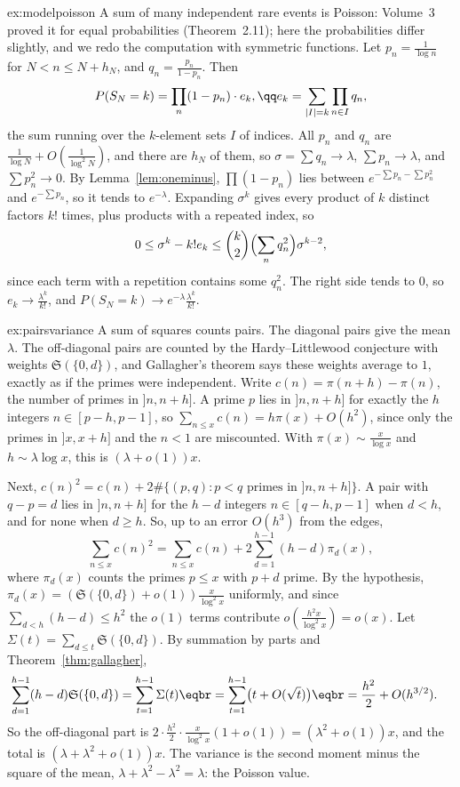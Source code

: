 \begin{solution}{ex:modelpoisson}
\idea A sum of many independent rare events is Poisson: Volume~3 proved it for equal probabilities (Theorem~2.11); here the probabilities differ slightly, and we redo the computation with symmetric functions.
\writeup Let $p_n=\frac1{\log n}$ for $N<n\le N+h_N$, and $q_n=\frac{p_n}{1-p_n}$. Then
\[
P(S_N=k)=\prod_n(1-p_n)\cdot e_k,\qq e_k=\sum_{|I|=k}\prod_{n\in I}q_n,
\]
the sum running over the $k$-element sets $I$ of indices. All $p_n$ and $q_n$ are $\frac1{\log N}+O(\frac1{\log^2N})$, and there are $h_N$ of them, so $\sigma=\sum q_n\to\lambda$, $\sum p_n\to\lambda$, and $\sum p_n^2\to0$. By
Lemma~\ref{lem:oneminus}, $\prod(1-p_n)$ lies between $e^{-\sum p_n-\sum p_n^2}$ and $e^{-\sum p_n}$, so it tends to $e^{-\lambda}$. Expanding $\sigma^k$ gives every product of $k$ distinct factors $k!$ times, plus products
with a repeated index, so
\[
0\le\sigma^k-k!e_k\le\binom k2\Bigl(\sum_nq_n^2\Bigr)\sigma^{k-2},
\]
since each term with a repetition contains some $q_n^2$. The right side tends to $0$, so $e_k\to\frac{\lambda^k}{k!}$, and $P(S_N=k)\to e^{-\lambda}\frac{\lambda^k}{k!}$.
\end{solution}

\begin{solution}{ex:pairsvariance}
\idea A sum of squares counts pairs. The diagonal pairs give the mean $\lambda$. The off-diagonal pairs are counted by the Hardy--Littlewood conjecture with weights $\mathfrak S(\{0,d\})$, and Gallagher's theorem
says these weights average to $1$, exactly as if the primes were independent.
\writeup Write $c(n)=\pi(n+h)-\pi(n)$, the number of primes in $]n,n+h]$. A prime $p$ lies in $]n,n+h]$ for exactly the $h$ integers $n\in[p-h,p-1]$, so
$\sum_{n\le x}c(n)=h\pi(x)+O(h^2)$, since only the primes in $]x,x+h]$ and the $n<1$ are miscounted. With $\pi(x)\sim\frac x{\log x}$ and $h\sim\lambda\log x$, this is $(\lambda+o(1))x$.

Next, $c(n)^2=c(n)+2\#\{(p,q):p<q\text{ primes in }]n,n+h]\}$. A pair with $q-p=d$ lies in $]n,n+h]$ for the $h-d$ integers $n\in[q-h,p-1]$ when $d<h$, and for none when $d\ge h$. So, up to an error $O(h^3)$ from the edges,
\[
\sum_{n\le x}c(n)^2=\sum_{n\le x}c(n)+2\sum_{d=1}^{h-1}(h-d)\pi_d(x),
\]
where $\pi_d(x)$ counts the primes $p\le x$ with $p+d$ prime. By the hypothesis, $\pi_d(x)=(\mathfrak S(\{0,d\})+o(1))\frac x{\log^2x}$ uniformly, and since $\sum_{d<h}(h-d)\le h^2$ the $o(1)$ terms contribute
$o(\frac{h^2x}{\log^2x})=o(x)$. Let $\Sigma(t)=\sum_{d\le t}\mathfrak S(\{0,d\})$. By summation by parts and Theorem~\ref{thm:gallagher},
\[
\begin{aligned}\sum_{d=1}^{h-1}(h-d)\mathfrak S(\{0,d\})&=\sum_{t=1}^{h-1}\Sigma(t)\eqbr=\sum_{t=1}^{h-1}\bigl(t+O(\sqrt t)\bigr)\eqbr=\frac{h^2}2+O(h^{3/2}).\end{aligned}
\]
So the off-diagonal part is $2\cdot\frac{h^2}2\cdot\frac x{\log^2x}(1+o(1))=(\lambda^2+o(1))x$, and the total is $(\lambda+\lambda^2+o(1))x$. The variance is the second moment minus the square of the mean,
$\lambda+\lambda^2-\lambda^2=\lambda$: the Poisson value.
\end{solution}

